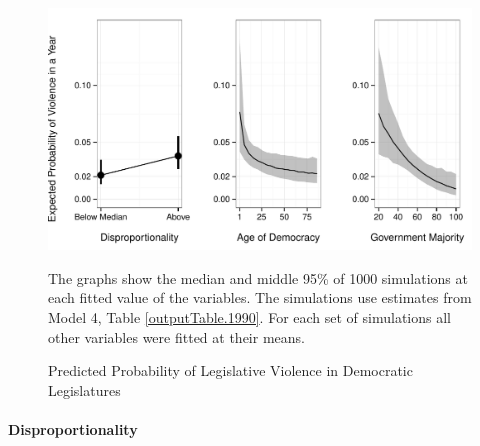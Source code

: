 \documentclass[a4paper]{article}\usepackage[]{graphicx}\usepackage[]{color}
\newenvironment{knitrout}{}{} %
\begin{document}
\begin{figure}[t]
    \begin{center}

\begin{knitrout}
\color{fgcolor}
\includegraphics[width=0.95\linewidth]{figure/predProb-1} 

\end{knitrout}
    \end{center}
    \caption{Predicted Probability of Legislative Violence in Democratic Legislatures}
    \label{pred_prob}
    \begin{singlespace}
      {\scriptsize{The graphs show the median and middle 95\% of 1000 simulations at each fitted value of the variables. The simulations use estimates from Model 4, Table \ref{outputTable.1990}. For each set of simulations all other variables were fitted at their means.}}
    \end{singlespace}
\end{figure}

\paragraph{Disproportionality}
\end{document}
